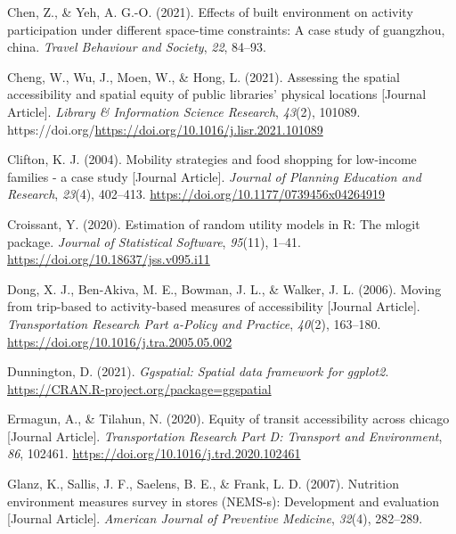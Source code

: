 \documentclass[review, 3p]{elsarticle} %
\newlength{\cslhangindent}
\newlength{\cslentryspacingunit} %
\newenvironment{CSLReferences}[2] %
 {%
  \setlength{\parindent}{0pt}
  \ifodd #1
  \let\oldpar\par
  \def\par{\hangindent=\cslhangindent\oldpar}
  \fi
  \setlength{\parskip}{#2\cslentryspacingunit}
 }%
 {}
\begin{document}
\begin{CSLReferences}{1}{0}
\leavevmode{}%
Chen, Z., \& Yeh, A. G.-O. (2021). Effects of built environment on activity participation under different space-time constraints: A case study of guangzhou, china. \emph{Travel Behaviour and Society}, \emph{22}, 84--93.

\leavevmode{}%
Cheng, W., Wu, J., Moen, W., \& Hong, L. (2021). Assessing the spatial accessibility and spatial equity of public libraries' physical locations {[}Journal Article{]}. \emph{Library \& Information Science Research}, \emph{43}(2), 101089. https://doi.org/\url{https://doi.org/10.1016/j.lisr.2021.101089}

\leavevmode{}%
Clifton, K. J. (2004). Mobility strategies and food shopping for low-income families - a case study {[}Journal Article{]}. \emph{Journal of Planning Education and Research}, \emph{23}(4), 402--413. \url{https://doi.org/10.1177/0739456x04264919}

\leavevmode{}%
Croissant, Y. (2020). Estimation of random utility models in {R}: The {mlogit} package. \emph{Journal of Statistical Software}, \emph{95}(11), 1--41. \url{https://doi.org/10.18637/jss.v095.i11}

\leavevmode{}%
Dong, X. J., Ben-Akiva, M. E., Bowman, J. L., \& Walker, J. L. (2006). Moving from trip-based to activity-based measures of accessibility {[}Journal Article{]}. \emph{Transportation Research Part a-Policy and Practice}, \emph{40}(2), 163--180. \url{https://doi.org/10.1016/j.tra.2005.05.002}

\leavevmode{}%
Dunnington, D. (2021). \emph{Ggspatial: Spatial data framework for ggplot2}. \url{https://CRAN.R-project.org/package=ggspatial}

\leavevmode{}%
Ermagun, A., \& Tilahun, N. (2020). Equity of transit accessibility across chicago {[}Journal Article{]}. \emph{Transportation Research Part D: Transport and Environment}, \emph{86}, 102461. \url{https://doi.org/10.1016/j.trd.2020.102461}

\leavevmode{}%
Glanz, K., Sallis, J. F., Saelens, B. E., \& Frank, L. D. (2007). Nutrition environment measures survey in stores (NEMS-s): Development and evaluation {[}Journal Article{]}. \emph{American Journal of Preventive Medicine}, \emph{32}(4), 282--289.


\end{CSLReferences}
\end{document}
